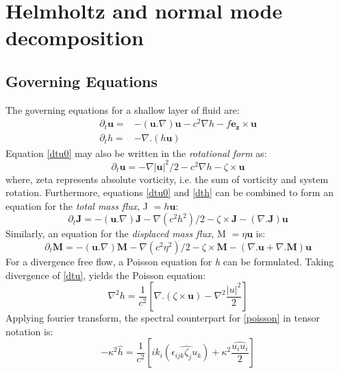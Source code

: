 \section{Helmholtz and normal mode decomposition}

\subsection{Governing Equations}

The governing equations for a shallow layer of fluid are:
\begin{align}
  \partial_t \mathbf u 
      = &- (\mathbf{u}.\nabla) \mathbf{u} - c^2 \nabla h - f\mathbf{e_z} \times 
\mathbf u \label{dtu0} \\
  \partial_t h 
      =& - \nabla. (h \mathbf u) \label{dth}
\end{align}
Equation \eqref{dtu0} may also be written in the \textit{rotational form} as:
\begin{equation}
 \label{dtu}
 \partial_t \mathbf u 
 = - \nabla |\mathbf u|^2/2 - c^2 \nabla h - \zeta \times \mathbf u
\end{equation}
where, \gls{zeta}
represents absolute vorticity, i.e. the sum of vorticity and system rotation.
Furthermore, equations \eqref{dtu0} and \eqref{dth} can be combined to form an 
equation for the \textit{total mass flux}, \gls{J} $= h\mathbf{u}$:
\begin{equation}
  \label{dtJ}
 \partial_t \mathbf J = -(\mathbf{u}.\nabla)\mathbf{J} - \nabla(c^2h^2)/2 -
\zeta \times \mathbf J - (\nabla. \mathbf J)\mathbf u
\end{equation}
Similarly, an equation for the \textit{displaced mass flux}, \gls{M} $ = 
\eta\mathbf{u}$ is:
\begin{equation}
  \label{dtM}
 \partial_t \mathbf M = -(\mathbf{u}.\nabla)\mathbf{M} - \nabla(c^2\eta^2)/2 - 
\zeta \times \mathbf M - (\nabla.\mathbf{u} + \nabla.\mathbf{M})\mathbf u
\end{equation}
For a divergence free flow, a Poisson equation for \emph{h} can be formulated.
Taking divergence of \eqref{dtu},
yields the Poisson equation:
\begin{equation}
  \label{poisson}
  \nabla^2 h = \frac{1}{c^2} \left[ \nabla.(\zeta \times \mathbf u )
	      - \nabla^2 \frac{|u|^2}{2} \right]
\end{equation}
Applying fourier transform, the spectral counterpart for \eqref{poisson} in 
tensor notation is:
\begin{equation}
\label{poisson_fft}
  -\kappa^2 \hat{h} = \frac{1}{c^2} \left[ ik_i (\widehat{\epsilon_{ijk} \zeta_j 
u_k})
	      + \kappa^2 \frac{\widehat{u_i u_i}}{2} \right]
\end{equation}

